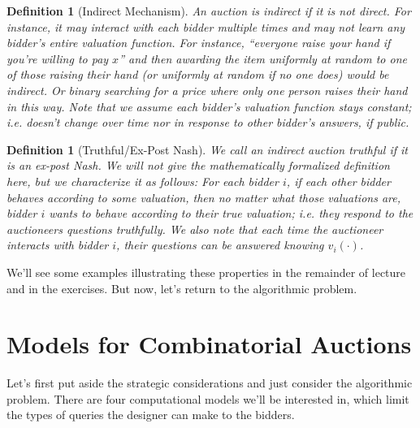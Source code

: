 \documentclass[12pt]{article}%
\newtheorem{definition}[theorem]{Definition}
\begin{document}
\begin{definition}[Indirect Mechanism] An auction is indirect if it is not direct. For instance, it may interact with each bidder multiple times and may not learn any bidder's entire valuation function. For instance, ``everyone raise your hand if you're willing to pay $x$'' and then awarding the item uniformly at random to one of those raising their hand (or uniformly at random if no one does) would be indirect. Or binary searching for a price where only one person raises their hand in this way. Note that we assume each bidder's valuation function stays constant; i.e. doesn't change over time nor in response to other bidder's answers, if public.
\end{definition}

\begin{definition}[Truthful/Ex-Post Nash] We call an indirect auction truthful if it is an ex-post Nash. We will not give the mathematically formalized definition here, but we characterize it as follows: For each bidder $i$, if each other bidder behaves according to some valuation, then no matter what those valuations are, bidder $i$ wants to behave according to their true valuation; i.e. they respond to the auctioneers questions truthfully. We also note that each time the auctioneer interacts with bidder $i$, their questions can be answered knowing $v_i(\cdot)$.
\end{definition}

We'll see some examples illustrating these properties in the remainder of lecture and in the exercises. But now, let's return to the algorithmic problem.

\section{Models for Combinatorial Auctions}
Let's first put aside the strategic considerations and just consider the algorithmic problem. There are four computational models we'll be interested in, which limit the types of queries the designer can make to the bidders.
\end{document}
